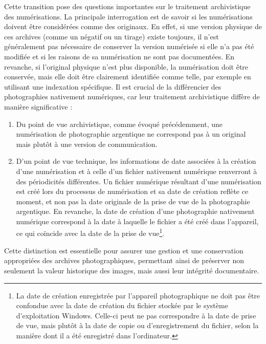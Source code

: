 Cette transition pose des questions importantes sur le traitement archivistique des numérisations. La principale interrogation est de savoir si les numérisations doivent être considérées comme des originaux. En effet, si une version physique de ces archives (comme un négatif ou un tirage) existe toujours, il n'est généralement pas nécessaire de conserver la version numérisée si elle n'a pas été modifiée et si les raisons de sa numérisation ne sont pas documentées. En revanche, si l'original physique n'est plus disponible, la numérisation doit être conservée, mais elle doit être clairement identifiée comme telle, par exemple en utilisant une indexation spécifique. Il est crucial de la différencier des photographies nativement numériques, car leur traitement archivistique diffère de manière significative :
\begin{enumerate}
    \item Du point de vue archivistique, comme évoqué précédemment, une numérisation de photographie argentique ne correspond pas à un original mais plutôt à une version de communication. 
    \item D'un point de vue technique, les informations de date associées à la création d'une numérisation et à celle d'un fichier nativement numérique renverront à des périodicités différentes. Un fichier numérique résultant d'une numérisation est créé lors du processus de numérisation et sa date de création reflète ce moment, et non pas la date originale de la prise de vue de la photographie argentique. En revanche, la date de création d'une photographie nativement numérique correspond à la date à laquelle le fichier a été créé dans l'appareil, ce qui coïncide avec la date de la prise de vue\footnote{La date de création enregistrée par l'appareil photographique ne doit pas être confondue avec la date de création du fichier stockée par le système d'exploitation Windows. Celle-ci peut ne pas correspondre à la date de prise de vue, mais plutôt à la date de copie ou d'enregistrement du fichier, selon la manière dont il a été enregistré dans l'ordinateur.}.
\end{enumerate}

Cette distinction est essentielle pour assurer une gestion et une conservation appropriées des archives photographiques, permettant ainsi de préserver non seulement la valeur historique des images, mais aussi leur intégrité documentaire.
\\

